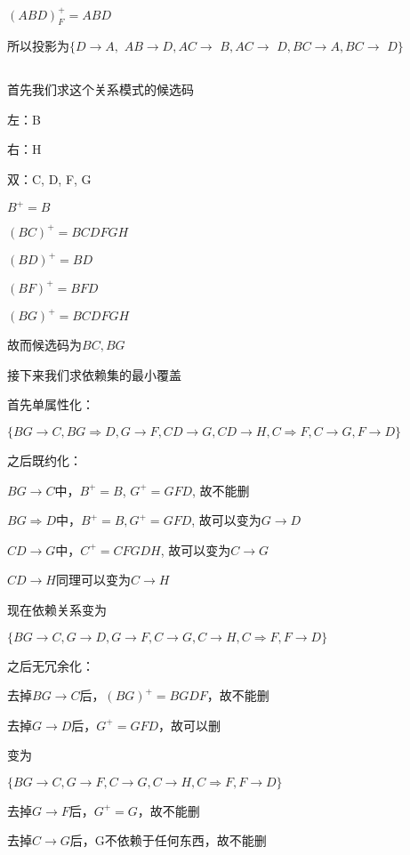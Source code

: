 \documentclass[UTF8]{ctexart}
\begin{document}
$(ABD)_F^+ = ABD$

所以投影为$\{D\rightarrow A, $
$AB\rightarrow D, AC\rightarrow $
$B, AC\rightarrow $
$D, BC\rightarrow A, BC\rightarrow $
$D\}$

\subsection{}

首先我们求这个关系模式的候选码

左：B

右：H

双：C, D, F, G

$B^+ = B$

$(BC)^+ = BCDFGH$

$(BD)^+ = BD$

$(BF)^+ = BFD$

$(BG)^+ = BCDFGH$

故而候选码为$BC, BG$

接下来我们求依赖集的最小覆盖

首先单属性化：

$\{
    BG\rightarrow C, 
    BG\Rightarrow D, 
    G\rightarrow F, 
    CD\rightarrow G, 
    CD\rightarrow H, 
    C\Rightarrow F, 
    C\rightarrow G, 
    F\rightarrow D
\}$

之后既约化：

$BG\rightarrow C$中，$B^+ = B$, $G^+ = GFD$, 故不能删

$BG\Rightarrow D$中，$B^+ = B, G^+ = GFD$, 故可以变为$G\rightarrow D$

$CD\rightarrow G$中，$C^+ = CFGDH$, 故可以变为$C\rightarrow G$

$CD\rightarrow H$同理可以变为$C\rightarrow H$

现在依赖关系变为

$\{
    BG\rightarrow C, 
    G\rightarrow D, 
    G\rightarrow F, 
    C\rightarrow G, 
    C\rightarrow H, 
    C\Rightarrow F, 
    F\rightarrow D
\}$

之后无冗余化：

去掉$BG\rightarrow C$后，$(BG)^+ = BGDF$，故不能删

去掉$G\rightarrow D$后，$G^+ = GFD$，故可以删

变为

$\{
    BG\rightarrow C, 
    G\rightarrow F, 
    C\rightarrow G, 
    C\rightarrow H, 
    C\Rightarrow F, 
    F\rightarrow D
\}$

去掉$G\rightarrow F$后，$G^+ = G$，故不能删

去掉$C\rightarrow G$后，G不依赖于任何东西，故不能删
\end{document}
